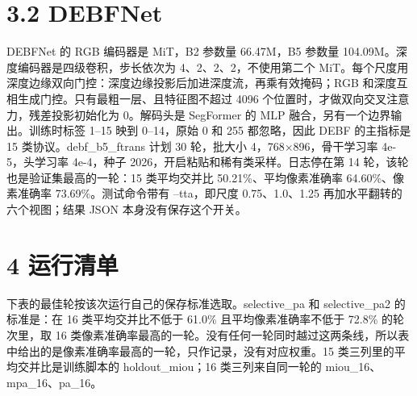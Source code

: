 \documentclass[11pt]{article}
\begin{document}
\section*{3.2  DEBFNet}
DEBFNet 的 RGB 编码器是 MiT，B2 参数量 66.47M，B5 参数量 104.09M。深度编码器是四级卷积，步长依次为 4、2、2、2，不使用第二个 MiT。每个尺度用深度边缘双向门控：深度边缘投影后加进深度流，再乘有效掩码；RGB 和深度互相生成门控。只有最粗一层、且特征图不超过 4096 个位置时，才做双向交叉注意力，残差投影初始化为 0。解码头是 SegFormer 的 MLP 融合，另有一个边界输出。训练时标签 1–15 映到 0–14，原始 0 和 255 都忽略，因此 DEBF 的主指标是 15 类协议。debf\_b5\_ftrans 计划 30 轮，批大小 4，768×896，骨干学习率 4e-5，头学习率 4e-4，种子 2026，开启粘贴和稀有类采样。日志停在第 14 轮，该轮也是验证集最高的一轮：15 类平均交并比 50.21\%、平均像素准确率 64.60\%、像素准确率 73.69\%。测试命令带有 --tta，即尺度 0.75、1.0、1.25 再加水平翻转的六个视图；结果 JSON 本身没有保存这个开关。

\section*{4  运行清单}
下表的最佳轮按该次运行自己的保存标准选取。selective\_pa 和 selective\_pa2 的标准是：在 16 类平均交并比不低于 61.0\% 且平均像素准确率不低于 72.8\% 的轮次里，取 16 类像素准确率最高的一轮。没有任何一轮同时越过这两条线，所以表中给出的是像素准确率最高的一轮，只作记录，没有对应权重。15 类三列里的平均交并比是训练脚本的 holdout\_miou；16 类三列来自同一轮的 miou\_16、mpa\_16、pa\_16。
\end{document}
